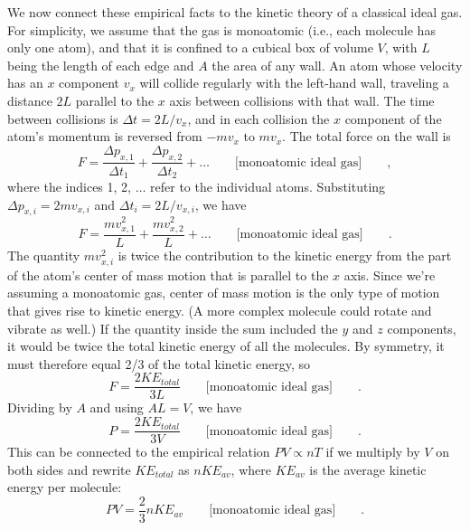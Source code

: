 We now connect these empirical facts to the kinetic theory
of a classical ideal gas. For simplicity, we assume that the gas is
monoatomic (i.e., each molecule has only one atom), and that
it is confined to a cubical box of volume $V$, with $L$ being
the length of each edge and $A$ the area of any wall. An atom
whose velocity has an $x$ component $v_x$ will collide regularly
with the left-hand wall, traveling a distance $2L$ parallel to
the $x$ axis between collisions with that wall. The time between collisions
is $\Delta t=2L/v_x$, and in each collision the $x$ component of
the atom's momentum is reversed from $-mv_x$  to $mv_x$. The total
force on the wall is
\begin{equation*}
        F =   \frac{\Delta p_{x,1}}{\Delta t_1}+\frac{\Delta p_{x,2}}{\Delta t_2}+\ldots  \qquad \text{[monoatomic ideal gas]} \qquad ,
\end{equation*}
where the indices 1, 2, $\ldots$ refer to the individual atoms.
Substituting $\Delta p_{x,i}=2mv_{x,i}$ and $\Delta t_i=2L/v_{x,i}$, we
have
\begin{equation*}
                F        =  \frac{mv_{x,1}^2}{L}+\frac{mv_{x,2}^2}{L}+\ldots \qquad \text{[monoatomic ideal gas]} \qquad .
\end{equation*}
The quantity $mv_{x,i}^2$ is twice the contribution to the
kinetic energy from the part of the atom's center of mass
motion that is parallel to the $x$ axis. Since we're assuming
a monoatomic gas, center of mass motion is the only type of
motion that gives rise to kinetic energy. (A more complex
molecule could rotate and vibrate as well.) If the quantity
inside the sum included the $y$ and $z$ components, it would be
twice the total kinetic energy of all the molecules. By
symmetry, it must therefore equal 2/3 of the total kinetic
energy, so
\begin{equation*}
        F        =   \frac{2KE_{total}}{3L} \qquad \text{[monoatomic ideal gas]} \qquad .
\end{equation*}
Dividing by $A$ and using $AL=V$, we have
\begin{equation*}
        P        =   \frac{2KE_{total}}{3V} \qquad \text{[monoatomic ideal gas]} \qquad .
\end{equation*}
This can be connected to the empirical relation $PV \propto nT$ if we
multiply by $V$ on both sides and rewrite $KE_{total}$ as $nKE_{av}$,
where $KE_{av}$ is the average kinetic energy per
molecule:
\begin{equation*}
        PV        =          \frac{2}{3}nKE_{av} \qquad \text{[monoatomic ideal gas]} \qquad .
\end{equation*}
